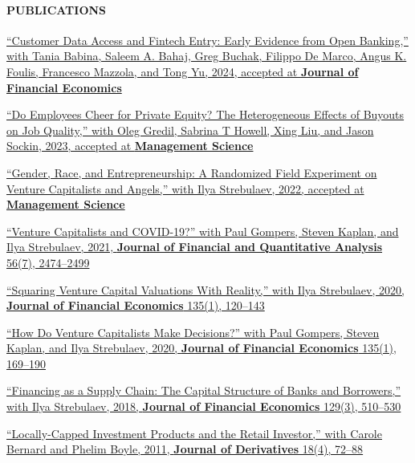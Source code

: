 \documentclass[11pt]{article}
\begin{document}
\paragraph{PUBLICATIONS}
\begin{nondatelist}
    \item \href{https://papers.ssrn.com/sol3/papers.cfm?abstract_id=4071214}{%
        ``Customer Data Access and Fintech Entry: Early Evidence from Open Banking,'' 
        with Tania Babina, Saleem A. Bahaj, Greg Buchak, Filippo De Marco, Angus K. Foulis, Francesco Mazzola, and Tong Yu, 
        2024, accepted at \textbf{Journal of Financial Economics}}

    \item \href{https://papers.ssrn.com/sol3/papers.cfm?abstract_id=3912230}{%
        ``Do Employees Cheer for Private Equity? The Heterogeneous Effects of Buyouts on Job Quality,'' 
        with Oleg Gredil, Sabrina T Howell, Xing Liu, and Jason Sockin, 
        2023, accepted at \textbf{Management Science}}

    \item \href{https://papers.ssrn.com/sol3/papers.cfm?abstract_id=3301982}{%
        ``Gender, Race, and Entrepreneurship: A Randomized Field Experiment on Venture Capitalists and Angels,'' 
        with Ilya Strebulaev, 
        2022, accepted at \textbf{Management Science}}

    \item \href{https://papers.ssrn.com/sol3/papers.cfm?abstract_id=3669345}{%
        ``Venture Capitalists and COVID-19?'' 
        with Paul Gompers, Steven Kaplan, and Ilya Strebulaev, 
        2021, \textbf{Journal of Financial and Quantitative Analysis} 56(7), 2474--2499}

    \item \href{https://papers.ssrn.com/sol3/papers.cfm?abstract_id=2955455}{%
        ``Squaring Venture Capital Valuations With Reality,'' 
        with Ilya Strebulaev, 
        2020, \textbf{Journal of Financial Economics} 135(1), 120--143}

    \item \href{https://papers.ssrn.com/sol3/papers.cfm?abstract_id=2801385}{%
        ``How Do Venture Capitalists Make Decisions?'' 
        with Paul Gompers, Steven Kaplan, and Ilya Strebulaev, 
        2020, \textbf{Journal of Financial Economics} 135(1), 169--190}

    \item \href{https://papers.ssrn.com/sol3/papers.cfm?abstract_id=2347107}{%
        ``Financing as a Supply Chain: The Capital Structure of Banks and Borrowers,'' 
        with Ilya Strebulaev, 
        2018, \textbf{Journal of Financial Economics} 129(3), 510--530}

    \item \href{https://papers.ssrn.com/sol3/papers.cfm?abstract_id=1101796}{%
        ``Locally-Capped Investment Products and the Retail Investor,'' 
        with Carole Bernard and Phelim Boyle, 
        2011, \textbf{Journal of Derivatives} 18(4), 72--88}
\end{nondatelist}
\end{document}
